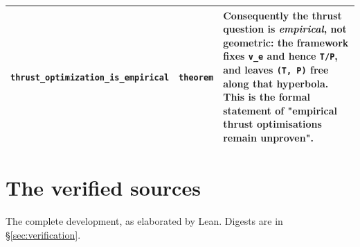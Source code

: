 \documentclass[11pt,a4paper]{article}
\begin{document}
\begin{center}
\begin{longtable}{@{}p{}p{}p{}@{}}
\texttt{thrust\_\allowbreak{}optimization\_\allowbreak{}is\_\allowbreak{}empirical} & \texttt{theorem} & \small Consequently the thrust question is \emph{empirical}, not geometric: the framework fixes \texttt{v\_\allowbreak{}e} and hence \texttt{T/P}, and leaves \texttt{(T, P)} free along that hyperbola.  This is the formal statement of "empirical thrust optimisations remain unproven". \\
\bottomrule
\end{longtable}
\end{center}


\clearpage
\section{The verified sources}
\label{app:sources}

The complete development, as elaborated by Lean.  Digests are in
\S\ref{sec:verification}.
\end{document}
